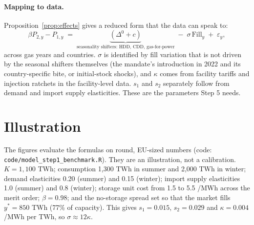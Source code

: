 \documentclass[11pt]{article}
\providecommand{\euro}{\texteuro}
\theoremstyle{definition}
\newcommand{\Dz}{\Delta^{0}}
\begin{document}
\paragraph{Mapping to data.} Proposition~\ref{prop:effects} gives a reduced form that the data can speak to:
\begin{equation}
\beta P_{2,y}-P_{1,y} \;=\; \underbrace{(\Dz+c)}_{\text{seasonality shifters: HDD, CDD, gas-for-power}} \;-\; \sigma\,\text{Fill}_{y} \;+\; \varepsilon_y ,
\end{equation}
across gas years and countries. $\sigma$ is identified by fill variation that is not driven by the seasonal shifters
themselves (the mandate's introduction in 2022 and its country-specific bite, or initial-stock shocks), and
$\kappa$ comes from facility tariffs and injection ratchets in the facility-level data. $s_1$ and $s_2$ separately follow
from demand and import supply elasticities. These are the parameters Step 5 needs.

\section{Illustration}\label{sec:illustration}

The figures evaluate the formulas on round, EU-sized numbers (code: \texttt{code/model\_step1\_benchmark.R}). They
are an illustration, not a calibration. $K=1{,}100$ TWh; consumption 1{,}300 TWh in summer and 2{,}000 TWh in winter;
demand elasticities 0.20 (summer) and 0.15 (winter); import supply elasticities 1.0 (summer) and 0.8 (winter); storage
unit cost from 1.5 to 5.5 \euro/MWh across the merit order; $\beta=0.98$; and the no-storage spread set so that the market
fills $y^*=850$ TWh (77\% of capacity). This gives $s_1=0.015$, $s_2=0.029$ and $\kappa=0.004$ \euro/MWh per TWh, so
$\sigma\approx 12\kappa$.
\end{document}
